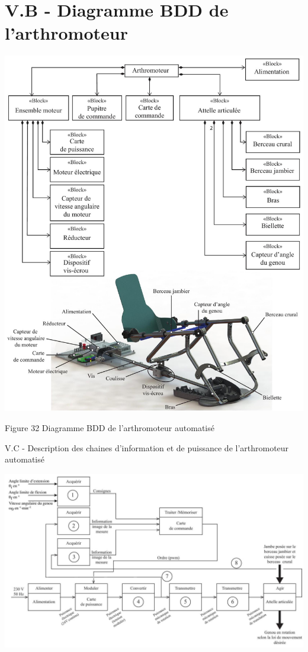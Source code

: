 \documentclass[10pt]{article}
\begin{document}
\section*{V.B - Diagramme BDD de l'arthromoteur}
\begin{center}
\includegraphics[max width=\textwidth]{2024_07_14_a83aebba33898893d39fg-20}
\end{center}

Figure 32 Diagramme BDD de l'arthromoteur automatisé

V.C - Description des chaines d'information et de puissance de l'arthromoteur automatisé

\begin{center}
\includegraphics[max width=\textwidth]{2024_07_14_a83aebba33898893d39fg-21}
\end{center}
\end{document}

